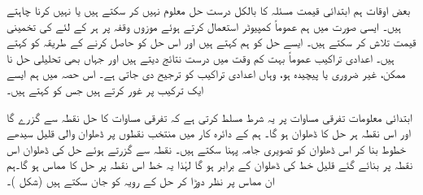 بعض اوقات ہم ابتدائی قیمت مسئلہ  کا بالکل درست حل معلوم نہیں کر سکتے ہیں یا نہیں کرنا چاہتے ہیں۔ ایسی صورت میں ہم عموماً کمپیوٹر استعمال کرتے ہوئے موزوں وقفہ پر ہر  کے لئے  کی تخمینی قیمت   تلاش کر سکتے ہیں۔ ایسے حل کو ہم  کہتے ہیں اور اس حل کو حاصل کرنے کے طریقہ کو  کہتے ہیں۔ اعدادی تراکیب عموماً بہت کم وقت میں  درست نتائج دیتے ہیں اور جہاں بھی تحلیلی حل نا ممکن، غیر ضروری یا پیچیدہ ہو، وہاں اعدادی تراکیب کو ترجیح دی جاتی ہے۔ اس حصہ میں ہم ایسے ایک ترکیب پر غور کرتے ہیں جس کو  کہتے ہیں۔ 

ابتدائی معلومات  تفرقی مساوات  پر یہ شرط مسلط کرتی ہے کہ تفرقی مساوات کا حل نقطہ   سے گزرے گا اور اس نقطہ ہر حل کا ڈھلوان  ہو گا۔ ہم  کے دائرہ کار میں منتخب نقطوں  پر  ڈھلوان والی قلیل سیدھے خطوط بنا کر اس ڈھلوان کو تصویری جامہ پہنا سکتے ہیں۔ نقطہ  سے گزرتے ہوئے حل کی ڈھلوان اس نقطہ پر بنائے گئے قلیل خط کی ڈھلوان کے برابر ہو گا لہٰذا یہ خط اس نقطہ پر حل کا مماس ہو گا۔ہم ان مماس پر نظر دوڑا کر حل کے رویہ کو جان سکتے ہیں (شکل )۔

